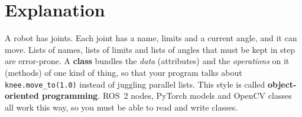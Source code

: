 \label{ch:py7}

\section*{Explanation}
A robot has joints. Each joint has a name, limits and a current angle, and it can move. Lists of names, lists of limits and lists of angles that must be kept in step are error-prone. A \textbf{class} bundles the \emph{data} (attributes) and the \emph{operations} on it (methods) of one kind of thing, so that your program talks about \texttt{knee.move\_to(1.0)} instead of juggling parallel lists. This style is called \textbf{object-oriented programming}. ROS~2 nodes, PyTorch models and OpenCV classes all work this way, so you must be able to read and write classes.

